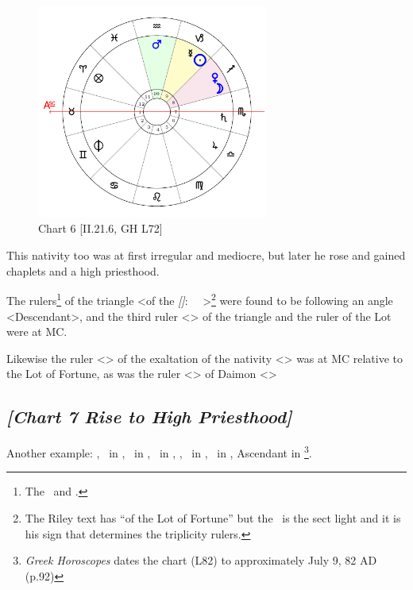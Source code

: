 \clearpage
\begin{figure}
\centering
\vspace{-20pt}
\includegraphics[width=0.68\textwidth]{charts/2_21_6}
\caption{Chart 6 [II.21.6, GH L72]}
\label{fig:chart06}
\end{figure}

This nativity too was at first irregular and mediocre, but later he rose and gained chaplets and a high priesthood. 

The rulers\footnote{The \Moon\, and \Venus.} of the triangle <of the \textsl{[\Sun]}: \Taurus\, \Virgo\, \Capricorn>\footnote{The Riley text has ``of the Lot of Fortune'' but the \Sun\, is the sect light and it is his sign that determines the triplicity rulers.}  were found to be following an angle <Descendant>, and the third ruler <\Mars> of the triangle and the ruler of the Lot were at MC. 

Likewise the ruler <\Sun> of the exaltation of the nativity <\Leo> was at MC relative to the Lot of Fortune, as was the ruler <\Mercury> of Daimon <\Gemini>

\newpage
\subsection*{\textit{[Chart 7 Rise to High Priesthood]}}

Another example: \Sun, \Mercury\, in \Cancer, \Moon\, in \Taurus, \Saturn\, in \Pisces, \Jupiter, \Mars\, in \Leo, \Venus\, in \Virgo, Ascendant in \Libra \footnote{\textit{Greek Horoscopes} dates the chart (L82) to approximately July 9, 82 AD (p.92)}.

